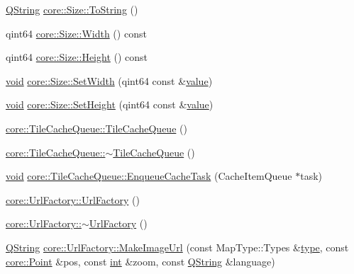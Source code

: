 \begin{DoxyCompactItemize}
\item 
\hyperlink{group___u_a_v_objects_plugin_gab9d252f49c333c94a72f97ce3105a32d}{Q\-String} \hyperlink{group___o_p_map_widget_ga69bf932485cc775bf1cd98d26961ebab}{core\-::\-Size\-::\-To\-String} ()
\item 
qint64 \hyperlink{group___o_p_map_widget_ga57df26ac2174659d7a906e8d31a34080}{core\-::\-Size\-::\-Width} () const 
\item 
qint64 \hyperlink{group___o_p_map_widget_ga9c12f3b98a93a81fab566f35d93c7d20}{core\-::\-Size\-::\-Height} () const 
\item 
\hyperlink{group___u_a_v_objects_plugin_ga444cf2ff3f0ecbe028adce838d373f5c}{void} \hyperlink{group___o_p_map_widget_gae28441c62e671e06cff1065e13176f33}{core\-::\-Size\-::\-Set\-Width} (qint64 const \&\hyperlink{glext_8h_aa0e2e9cea7f208d28acda0480144beb0}{value})
\item 
\hyperlink{group___u_a_v_objects_plugin_ga444cf2ff3f0ecbe028adce838d373f5c}{void} \hyperlink{group___o_p_map_widget_gaeb60d897c19a5a111737e862c17dadbd}{core\-::\-Size\-::\-Set\-Height} (qint64 const \&\hyperlink{glext_8h_aa0e2e9cea7f208d28acda0480144beb0}{value})
\item 
\hyperlink{group___o_p_map_widget_gaf4b26a2fbfd128dce8b96fa82f4230dd}{core\-::\-Tile\-Cache\-Queue\-::\-Tile\-Cache\-Queue} ()
\item 
\hyperlink{group___o_p_map_widget_ga09862b0024b636bee196029e0a98cfc4}{core\-::\-Tile\-Cache\-Queue\-::$\sim$\-Tile\-Cache\-Queue} ()
\item 
\hyperlink{group___u_a_v_objects_plugin_ga444cf2ff3f0ecbe028adce838d373f5c}{void} \hyperlink{group___o_p_map_widget_gaa3b5dbe5d3c7b4f98f540bb4bb38f3d1}{core\-::\-Tile\-Cache\-Queue\-::\-Enqueue\-Cache\-Task} (Cache\-Item\-Queue $\ast$task)
\item 
\hyperlink{group___o_p_map_widget_gabc044615454cf1ce949b090b45a3b20d}{core\-::\-Url\-Factory\-::\-Url\-Factory} ()
\item 
\hyperlink{group___o_p_map_widget_ga67b13bc9e7c21c4fcc4471ddce351805}{core\-::\-Url\-Factory\-::$\sim$\-Url\-Factory} ()
\item 
\hyperlink{group___u_a_v_objects_plugin_gab9d252f49c333c94a72f97ce3105a32d}{Q\-String} \hyperlink{group___o_p_map_widget_ga7339895a709cbc83dfac87ec5e1a42ff}{core\-::\-Url\-Factory\-::\-Make\-Image\-Url} (const Map\-Type\-::\-Types \&\hyperlink{glext_8h_a7d05960f4f1c1b11f3177dc963a45d86}{type}, const \hyperlink{structcore_1_1_point}{core\-::\-Point} \&pos, const \hyperlink{ioapi_8h_a787fa3cf048117ba7123753c1e74fcd6}{int} \&zoom, const \hyperlink{group___u_a_v_objects_plugin_gab9d252f49c333c94a72f97ce3105a32d}{Q\-String} \&language)

\end{DoxyCompactItemize}

